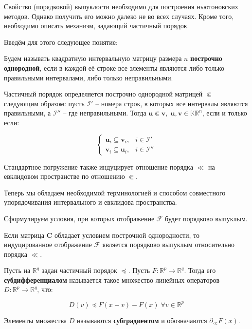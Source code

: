 Свойство (порядковой) выпуклости необходимо для построения ньютоновских методов. Однако получить его можно далеко не во всех случаях. Кроме того, необходимо описать механизм, задающий частичный порядок.

Введём для этого следующее понятие:

\begin{definition}
	Будем называть квадратную интервальную матрицу размера $n$ \textbf{построчно однородной}, если в каждой её строке все элементы являются либо только правильными интервалами, либо только неправильными.
\end{definition}

Частичный порядок определяется построчно однородной матрицей $\Subset$ следующим образом: пусть $\mathcal{I}'$ -- номера строк, в которых все интервалы являются правильными, а $\mathcal{I}''$ -- где неправильными. Тогда $\mathbf{u} \Subset \mathbf{v}, \; \mathbf{u, v} \in \mathbb{KR}^n$, если и только если:

\begin{equation}
\begin{cases}
\mathbf{u}_i \subseteq \mathbf{v}_i, & i \in \mathcal{I}' \\

\mathbf{v}_i \subseteq \mathbf{u}_i, & i \in \mathcal{I}''

\end{cases} 
\end{equation}

Стандартное погружение также индуцирует отношение порядка $\ll$ на евклидовом пространстве по отношению $\Subset$.

Теперь мы обладаем необходимой терминологией и способом совместного упорядочивания интервального и евклидова пространства.

Сформулируем условия, при которых отображение $\mathcal{F}$ будет порядково выпуклым.

\begin{theorem}
	Если матрица $\mathbf{C}$ обладает условием построчной однородности, то индуцированное отображение $\mathcal{F}$ является порядково выпуклым относительно порядка $\ll$.
\end{theorem}

\begin{definition}
	Пусть на $\mathbb{R}^q$ задан частичный порядок $\preccurlyeq$. Пусть   $F: \mathbb{R}^p \rightarrow \mathbb{R}^q$. Тогда его \textbf{субдифференциалом} называется такое множество линейных операторов $D: \mathbb{R}^p \rightarrow \mathbb{R}^q$, что:
	
	\begin{equation}
	D(v) \preccurlyeq F(x + v) - F(x) \; \forall v \in \mathbb{R}^p
	\end{equation}
	
	Элементы множества $D$ называются \textbf{субградиентом} и обозначаются $\partial_{\ll}F(x)$.
\end{definition}


